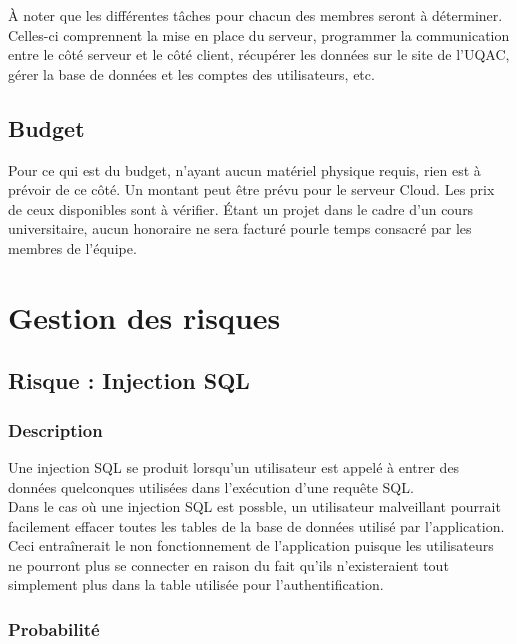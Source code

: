 \documentclass[12pt]{article}
\begin{document}
À noter que les différentes tâches pour chacun des membres seront à déterminer. Celles-ci comprennent la mise en place du serveur, programmer la communication entre le côté serveur et le côté client, récupérer les données sur le site de l'UQAC, gérer la base de données et les comptes des utilisateurs, etc.

\subsection{Budget}

Pour ce qui est du budget, n'ayant aucun matériel physique requis, rien est à prévoir de ce côté. Un montant peut être prévu pour le serveur Cloud. Les prix de ceux disponibles sont à vérifier. Étant un projet dans le cadre d'un cours universitaire, aucun honoraire ne sera facturé pourle temps consacré par les membres de l'équipe.

\newpage

\section{Gestion des risques}


\subsection{Risque : Injection SQL}

\subsubsection*{Description}

Une injection SQL se produit lorsqu'un utilisateur est appelé à entrer des données quelconques
utilisées dans l'exécution d'une requête SQL. \\

Dans le cas où une injection SQL est possble, un utilisateur malveillant pourrait
facilement effacer toutes les tables de la base de données utilisé par l'application.
Ceci entraînerait le non fonctionnement de l'application puisque les utilisateurs
ne pourront plus se connecter en raison du fait qu'ils n'existeraient tout simplement
plus dans la table utilisée pour l'authentification.

\subsubsection*{Probabilité}
\end{document}
